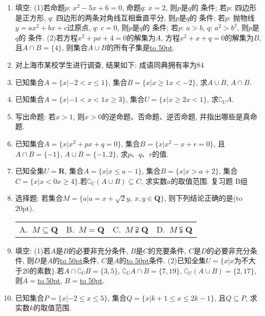 \documentclass[10pt,a4paper]{article}
\newcommand{\blank}[1]{\underline{\hbox to #1pt{}}}
\newcommand{\bracket}[1]{(\hbox to #1pt{})}
\newcommand{\fourch}[4]{\par\begin{tabular}{p{.23\textwidth}p{.23\textwidth}p{.23\textwidth}p{.23\textwidth}}
A.~#1 &B.~#2& C.~#3& D.~#4
\end{tabular}}
\begin{document}
\begin{enumerate}[1.]
\fourch{自然数集N中最小的数是1}{空集是任何集合的真子集}{如果$A\subseteq B$, 且$A\ne B$, 那么$A$是$B$的真子集}{$\{y|y=x+3,x\in \mathbf{N}\}$中的最小值是4}
(2)若$A\cap B=A$, 则\bracket{20}.
\fourch{$\complement _BA\cup A=\varnothing$}{$\complement _BA\cap A=\varnothing$}{$\complement _BA\cup \complement _BB=\varnothing$}{$\complement _BA\cap A=\varnothing$}
(3)已知$I$是全集.若$M$、$P$、$S$是$I$的3个子集, 则图中阴影部分所表示的集合是\bracket{20}.
(第1(3)题)
\fourch{$(M\cap P)\cap S$}{$(M\cap P)\cup S$}{$(M\cap P)\cap \complement _IS$}{$(M\cap P)\cup \complement _IS$}
\item 填空:
(1)若命题$p$: $x^2-5x+6=0$, 命题$q$: $x=2$, 则$p$是$q$的 条件;
若$p$: 四边形是正方形, $q$: 四边形的两条对角线互相垂直平分, 则$p$是$q$的    条件;
若$p$: 抛物线$y=ax^2+bx+c$过原点, $q$: $c=0$, 则$p$是$q$的    条件;
若$p$: $a>b$, $q$: $a^2>b^2$, 则$p$是$q$的    条件.
(2)若方程$x^2+px+4=0$的解集为$A$, 方程$x^2+x+q=0$的解集为$B$, 且$A\cap B=\{4\}$, 则集合$A\cup B$的所有子集是\blank{50}.
\item 对上海市某校学生进行调查, 结果如下: 成语同典拥有率为84%
\item 已知集合$A=\{x|-2<x\le 1\}$, 集合$B=\{x|x\ge 1x<-2\}$, 求$A\cup B$, $A\cap B$.
\item 已知集合$A=\{x|-1<x<1x\ge 3\}$, 集合$U=\{x|x\ge 2x<1\}$, 求$\complement _UA$.
\item 写出命题: 若$x>1$, 则$x>0$的逆命题、否命题、逆否命题, 并指出哪些是真命题.
\item 已知集合$A=\{x|x^2+px+q=0\}$, 集合$B=\{x|x^2-x+r=0\}$, 且$A\cap B=\{-1\}$, $A\cup B=\{-1,2\}$, 求$p$、$q$、$r$的值.
\item 已知全集$U=\mathbf{R}$, 集合$A=\{x|x\le a-1\}$, 集合$B=\{x|x>a+2\}$, 集合$C=\{x|x<0x\ge 4\}$.若$\complement _U(A\cup B)\subseteq C$, 求实数$a$的取值范围.
复习题
B组
\item 选择题:
若集合$M=\{a|a=x+\sqrt 2y,\ x,y\in \mathbf{Q}\}$, 则下列结论正确的是\bracket{20}.
\fourch{$M\subseteq \mathbf{Q}$}{$M=\mathbf{Q}$}{$M\supsetneqq \mathbf{Q}$}{$M\subsetneqq \mathbf{Q}$}
\item 填空:
(1)若$A$是$B$的必要非充分条件, $B$是$C$的充要条件, $C$是$D$的必要非充分条件, 则$D$是$A$的\blank{50}条件, $C$是$A$的\blank{50}条件.
(2)已知全集$U=\{x|x$为不大于20的素数$\}$.若$A\cap \complement _UB=\{3,5\}$, $\complement _UA\cap B=\{7,19\}$, $\complement _U(A\cup B)=\{2,17\}$, 则$A=$\blank{50}, $B=$\blank{50}.
\item 已知集合$P=\{x|-2\le x\le 5\}$, 集合$Q=\{x|k+1\le x\le 2k-1\}$, 且$Q\subseteq P$, 求实数$k$的取值范围.

\end{enumerate}
\end{document}
